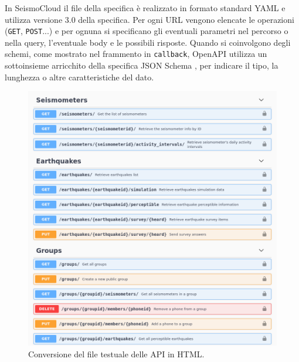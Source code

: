 In SeismoCloud il file della specifica è realizzato in formato standard YAML \cite{yaml} e utilizza versione 3.0 della specifica. Per ogni URL vengono elencate le operazioni (\texttt{GET}, \texttt{POST}...) e per ognuna si specificano gli eventuali parametri nel percorso o nella query, l'eventuale body e le possibili risposte. Quando si coinvolgono degli schemi, come mostrato nel frammento in \texttt{callback}, OpenAPI utilizza un sottoinsieme arricchito della specifica JSON Schema \cite{json-schema}, per indicare il tipo, la lunghezza o altre caratteristiche del dato.

\afterpage{\clearpage} %

\begin{figure}[ht]
\centering
\includegraphics[width=\textwidth]{assets/03/openapi.png}
\caption{Conversione del file testuale delle API in HTML.}
\label{fig:openapi-render}
\end{figure}

